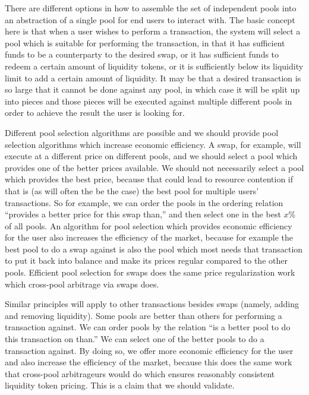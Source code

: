 \documentclass[12pt]{article}
\begin{document}
There are different options in how to assemble the set of independent pools into an abstraction of a single
pool for end users to interact with. The basic concept here is that when a user wishes to perform a transaction,
the system will select a pool which is suitable for performing the transaction, in that it has sufficient
funds to be a counterparty to the desired swap, or it has sufficient funds to redeem a certain amount of
liquidity tokens, or it is sufficiently below its liquidity limit to add a certain amount of liquidity.
It may be that a desired transaction is so large that it cannot be done against any pool, in which case
it will be split up into pieces and those pieces will be executed against multiple different pools in
order to achieve the result the user is looking for.

Different pool selection algorithms are possible and we should provide pool selection algorithms
which increase economic efficiency. A swap, for example, will execute at a different price on different
pools, and we should select a pool which provides one of the better prices available. We should not
necessarily select a pool which provides the best price, because that could lead to resource contention
if that is (as will often the be the case) the best pool for multiple users' transactions. So for example,
we can order the pools in the ordering relation ``provides a better price for this swap than,''
and then select one in the best $x\%$ of all pools. An algorithm for pool selection which provides
economic efficiency for the user also increases the efficiency of the market, because for example the
best pool to do a swap against is also the pool which most needs that transaction to put it back into
balance and make its prices regular compared to the other pools. Efficient pool selection for swaps
does the same price regularization work which cross-pool arbitrage via swaps does.

Similar principles will apply to other transactions besides swaps (namely, adding and removing liquidity).
Some pools are better than others for performing a transaction against. We can order pools by the relation
``is a better pool to do this transaction on than.'' We can select one of the better pools to do a transaction
against. By doing so, we offer more economic efficiency for the user and also increase the efficiency of the
market, because this does the same work that cross-pool arbitrageurs would do which ensures reasonably
consistent liquidity token pricing. This is a claim that we should validate.
\end{document}
